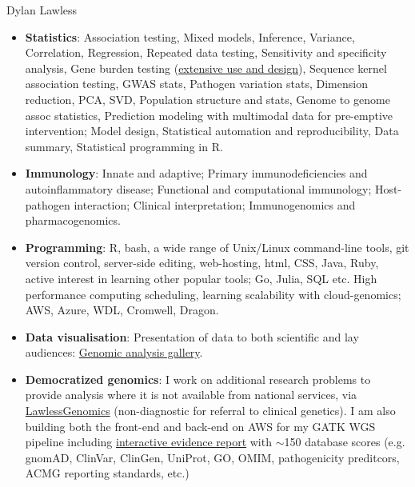 \documentclass[11pt,a4paper]{article}
\begin{document}
\begin{cv}{Dylan Lawless}
\begin{itemize}[leftmargin=*]
\item \textbf{Statistics}: 
	 Association testing, 
	 Mixed models, 
	 Inference, 
	 Variance,
	 Correlation, 
	 Regression,
	 Repeated data testing,
	 Sensitivity and specificity analysis,
	Gene burden testing (\href{https://lawlessgenomics.com/topic/burden-test}{extensive use and design}),
	Sequence kernel association testing,
	GWAS stats,
	Pathogen variation stats,
	Dimension reduction, PCA, SVD,
	Population structure and stats,
	Genome to genome assoc statistics,
	Prediction modeling with multimodal data for pre-emptive intervention;
	Model design,
	Statistical automation and reproducibility,
	Data summary, 
	Statistical programming in R.

\item \textbf{Immunology}:
	 Innate and adaptive;
	 Primary immunodeficiencies and autoinflammatory disease;
	 Functional and computational immunology;
	 Host-pathogen interaction;
	 Clinical interpretation;
	 Immunogenomics and pharmacogenomics.
	 
\item \textbf{Programming}:
	R, bash, a wide range of Unix/Linux command-line tools, git version control, server-side editing, web-hosting, html, CSS, Java, Ruby, active interest in learning other popular tools; Go, Julia, SQL etc. High performance computing scheduling, learning scalability with cloud-genomics; AWS, Azure, WDL, Cromwell, Dragon. 

\item \textbf{Data visualisation}: Presentation of data to both scientific and lay audiences: \href{https://lawlessgenomics.com/portfolio}{Genomic analysis gallery}.  

\item \textbf{Democratized genomics}: I work on additional research problems to provide analysis where it is not available from national services, via \href{https://lawlessgenomics.com}{LawlessGenomics} (non-diagnostic for referral to clinical genetics). I am also building both the front-end and back-end on AWS for my GATK WGS pipeline including \href{https://lawlessgenomics.com/topic/evidence_builder.html}{interactive evidence report} with $\sim$150 database scores (e.g. gnomAD, ClinVar, ClinGen, UniProt, GO, OMIM, pathogenicity preditcors, ACMG reporting standards, etc.)


\end{itemize}
\end{cv}
\end{document}

